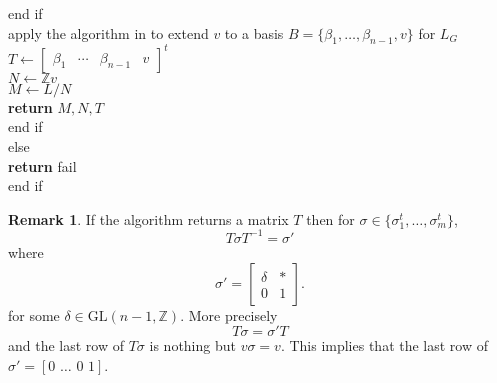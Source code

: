 \documentclass{article}
\theoremstyle{plain}
\theoremstyle{definition}
\newtheorem*{remark}{Remark}
\newcommand{\Z}{\ensuremath{\mathbb{Z}}}
\begin{document}
\begin{algorithm}[H]
\begin{algorithmic}[1]
	    \hspace{0.5 in} end if\\
	    \hspace{0.5in} apply the algorithm in \cite{LatticeBase} to extend $v$ to a basis $B = \lbrace \beta_1, \ldots, \beta_{n-1},v\rbrace$ for $L_G$\\
	    \hspace{0.5in} $T \gets \begin{bmatrix}
	    \beta_1 &  \cdots &  \beta_{n-1}& v
	    \end{bmatrix}^t$\\
		\hspace{0.5in} $N \gets \Z v$\\
		\hspace{0.5in} $M \gets L/N$\\
		\hspace{0.5in} \textbf{return} $M,N, T$\\
	  \hspace{0.5in} end if\\
	  else\\
	     \hspace{0.5in}  \textbf{return} fail\\
	     end if
	 	\end{algorithmic}
\end{algorithm}
\begin{remark}
If the algorithm returns a matrix $T$ then for $\sigma \in \lbrace \sigma^t_1, \ldots , \sigma^t_m \rbrace$, 
$$T \sigma T^{-1} = \sigma'$$ where $$\sigma' = \left[ \begin{array}{c|c}
\delta & \ast \\
\hline
0 &1 
\end{array}\right]. 
$$
for some $\delta \in \mathrm{GL}(n-1, \Z)$. More precisely $$T \sigma = \sigma'T$$ and the last row of $T \sigma$ is nothing but $v \sigma = v$. This implies that the last row of $\sigma' = [0 \,\, \ldots \,\, 0 \,\, 1]$.
\end{remark}
\end{document}
